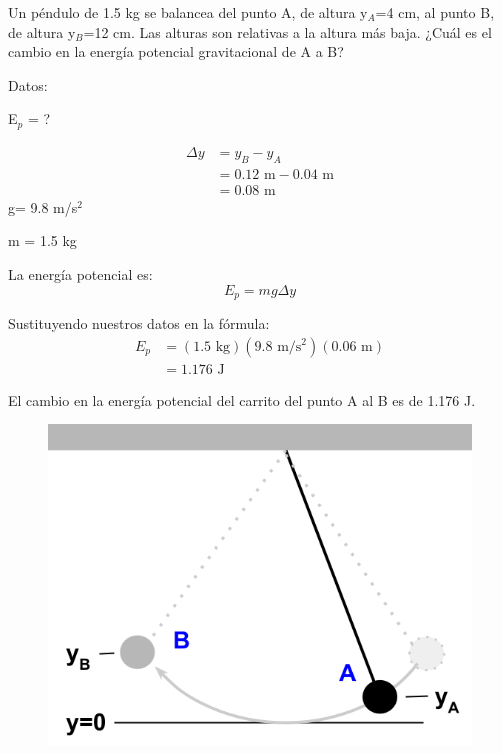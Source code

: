 Un péndulo de 1.5 kg se balancea del punto A, de altura y$_A$=4 cm, al punto B, de altura y$_B$=12 cm. Las alturas son relativas a la altura más baja. ¿Cuál es el cambio en la energía potencial gravitacional de A a B?

\begin{minipage}{0.68\textwidth}
    \begin{solutionbox}{6cm}
        \begin{multicols}{2}
            Datos:

            E$_p$ = ?

            \[
                \begin{array}{rl}
                    \Delta y & = y_B - y_A                       \\
                             & = 0.12 \text{ m} - 0.04 \text{ m} \\
                             & = 0.08 \text{ m}
                \end{array}
            \]
            g= 9.8 m/s$^2$

            m = 1.5 kg

            \vspace{2cm}

            La energía potencial es:
            \[E_p=mg\Delta y\]


            Sustituyendo nuestros datos en la fórmula:
            \[
                \begin{array}{rl}
                    E_p & = (1.5 \text{ kg})(9.8 \text{ m/s$^2$})(0.06 \text{ m}) \\[1em]
                        & =1.176 \text{ J }
                \end{array}
            \]

        \end{multicols}
        \begin{center}El cambio en la energía potencial del carrito del punto A al B es de 1.176 J.\end{center}
    \end{solutionbox}
\end{minipage}\hfill
\begin{minipage}{0.25\textwidth}
    \begin{figure}[H]
        \includegraphics[width=\linewidth]{../images/6a76ea922093e6e5057e27a98cc0f8852d616580}
    \end{figure}
\end{minipage}

